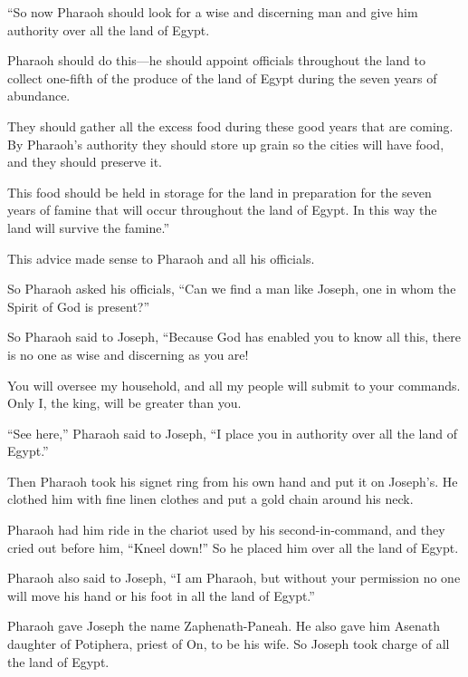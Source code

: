 \begin{scripture}
 ``So now Pharaoh should look for a wise and discerning man and give him authority over all the land of Egypt.
 Pharaoh should do this---he should appoint officials throughout the land to collect one-fifth of the produce of the land of Egypt during the seven years of abundance.
 They should gather all the excess food during these good years that are coming. By Pharaoh's authority they should store up grain so the cities will have food, and they should preserve it.
 This food should be held in storage for the land in preparation for the seven years of famine that will occur throughout the land of Egypt. In this way the land will survive the famine.''
\everypar{}

 This advice made sense to Pharaoh and all his officials.
 So Pharaoh asked his officials, ``Can we find a man like Joseph, one in whom the Spirit of God is present?''
 So Pharaoh said to Joseph, ``Because God has enabled you to know all this, there is no one as wise and discerning as you are!
 You will oversee my household, and all my people will submit to your commands. Only I, the king, will be greater than you.
\everypar{}

 ``See here,'' Pharaoh said to Joseph, ``I place you in authority over all the land of Egypt.''
 Then Pharaoh took his signet ring from his own hand and put it on Joseph's. He clothed him with fine linen clothes and put a gold chain around his neck.
 Pharaoh had him ride in the chariot used by his second-in-command, and they cried out before him, ``Kneel down!'' So he placed him over all the land of Egypt.
 Pharaoh also said to Joseph, ``I am Pharaoh, but without your permission no one will move his hand or his foot in all the land of Egypt.''
 Pharaoh gave Joseph the name Zaphenath-Paneah. He also gave him Asenath daughter of Potiphera, priest of On, to be his wife. So Joseph took charge of all the land of Egypt.
\everypar{}


\end{scripture}
